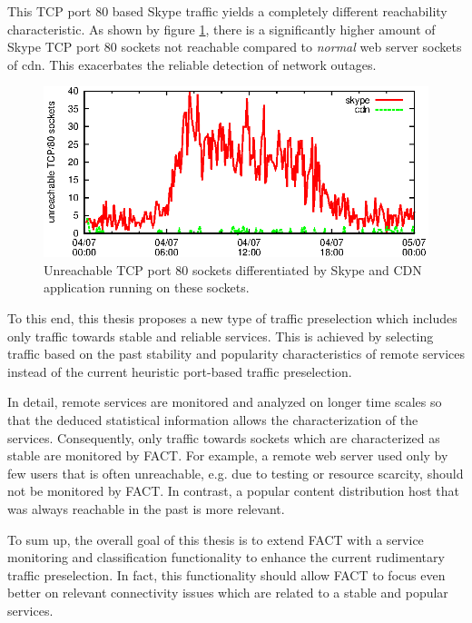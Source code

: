 This \gls{TCP} port 80 based Skype traffic yields a completely different 
reachability characteristic. 
As shown by figure \ref{fig:skype_traffic}, there is a 
significantly higher amount of Skype \gls{TCP} port 80 sockets not reachable 
compared to \emph{normal} web server sockets of \gls{cdn}. This exacerbates the 
reliable detection of network outages. 

\begin{figure}
	[ht] \centering
	\includegraphics[width=12cm]{images/application_fact.eps}
	\caption{Unreachable TCP port 80 sockets differentiated by Skype and CDN application running on these sockets. \citep{SchatzmanThesis2012}} 
	\label{fig:skype_traffic}
\end{figure}

To this end, this thesis proposes a new type of traffic preselection which 
includes only traffic towards stable and reliable services. This is achieved by 
selecting traffic based on the past stability and popularity characteristics of 
remote services instead of the current heuristic port-based traffic 
preselection.

In detail, remote services are monitored and analyzed on longer time scales so
that the deduced statistical information allows the characterization of the 
services. Consequently, only traffic towards sockets which are characterized as 
stable are monitored by \gls{FACT}. For example, a remote web server used only 
by few users that is often unreachable, e.g. due to testing or resource 
scarcity, should not be monitored by \gls{FACT}. In contrast, a popular content 
distribution host that was always reachable in the past is more relevant. 

To sum up, the overall goal of this thesis is to extend \gls{FACT} with a 
service monitoring and classification functionality to enhance the current 
rudimentary traffic preselection. In fact, this functionality should allow 
\gls{FACT} to focus even better on relevant connectivity issues which are 
related to a stable and popular services.

